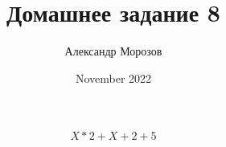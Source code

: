 \documentclass{article}
\title{Домашнее задание 8}
\author{Александр Морозов}
\date{November 2022}
\begin{document}
    \[{{{{X}*{2}}+{{X}+{2}}}+{5}}\]

	
\end{document}
